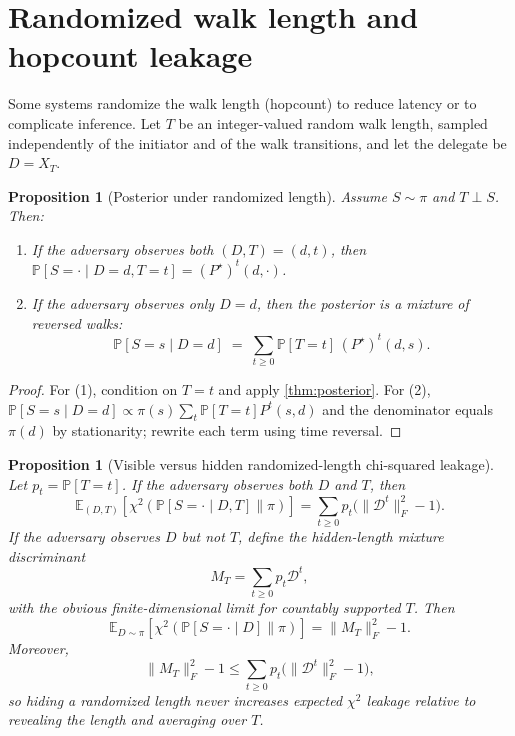 \documentclass[11pt]{article}
\newtheorem{proposition}[theorem]{Proposition}
\newcommand{\E}{\mathbb{E}}
\newcommand{\Prb}{\mathbb{P}}
\newcommand{\cD}{\mathcal{D}}
\begin{document}
\section{Randomized walk length and hopcount leakage}\label{sec:randlen}
Some systems randomize the walk length (hopcount) to reduce latency or to
complicate inference. Let $T$ be an integer-valued random walk length, sampled
independently of the initiator and of the walk transitions, and let the delegate
be $D=X_T$.

\begin{proposition}[Posterior under randomized length]\label{prop:randlen}
Assume $S\sim\pi$ and $T\perp S$. Then:
\begin{enumerate}[leftmargin=1.6em]
\item If the adversary observes both $(D,T)=(d,t)$, then
$\Prb[S=\cdot\mid D=d,T=t]=(P^\star)^t(d,\cdot)$.
\item If the adversary observes only $D=d$, then the posterior is a mixture of
reversed walks:
\[
\Prb[S=s\mid D=d] \;=\; \sum_{t\ge 0} \Prb[T=t]\,(P^\star)^t(d,s).
\]
\end{enumerate}
\end{proposition}

\begin{proof}
For (1), condition on $T=t$ and apply \cref{thm:posterior}. For (2),
$\Prb[S=s\mid D=d]\propto \pi(s)\sum_t \Prb[T=t]P^t(s,d)$ and the denominator
equals $\pi(d)$ by stationarity; rewrite each term using time reversal.
\end{proof}

\begin{proposition}[Visible versus hidden randomized-length chi-squared leakage]\label{prop:randlen-chi2}
Let $p_t=\Prb[T=t]$.  If the adversary observes both $D$ and $T$, then
\[
\E_{(D,T)}\!\left[\chi^2(\Prb[S=\cdot\mid D,T]\|\pi)\right]
=\sum_{t\ge0}p_t\bigl(\|\cD^t\|_F^2-1\bigr).
\]
If the adversary observes $D$ but not $T$, define the hidden-length mixture
discriminant
\[
M_T=\sum_{t\ge0}p_t\cD^t,
\]
with the obvious finite-dimensional limit for countably supported $T$.  Then
\[
\E_{D\sim\pi}\!\left[\chi^2(\Prb[S=\cdot\mid D]\|\pi)\right]
=\|M_T\|_F^2-1.
\]
Moreover,
\[
\|M_T\|_F^2-1
\le \sum_{t\ge0}p_t\bigl(\|\cD^t\|_F^2-1\bigr),
\]
so hiding a randomized length never increases expected $\chi^2$ leakage relative
to revealing the length and averaging over $T$.
\end{proposition}
\end{document}

